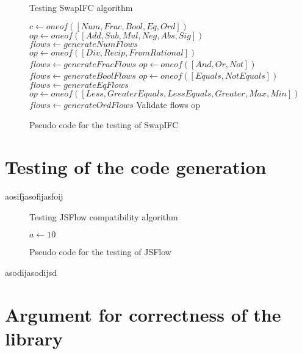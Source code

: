 \begin{figure}[h]
  \begin{algorithm}[H]
    \caption{Testing SwapIFC algorithm}
    \begin{algorithmic}
      \State $c\gets oneof([Num, Frac, Bool, Eq, Ord])$
      \State $op\gets oneof([Add, Sub, Mul, Neg, Abs, Sig])$
      \State $flows\gets generateNumFlows$
      \EndIf        
      \State $op\gets oneof([Div, Recip, FromRational])$
      \State $flows\gets generateFracFlows$
      \EndIf
      \State $op\gets oneof([And, Or, Not])$
      \State $flows\gets generateBoolFlows$
      \EndIf
      \State $op\gets oneof([Equals, NotEquals])$
      \State $flows\gets generateEqFlows$
      \EndIf
      \State $op\gets oneof([Less, GreaterEquals, LessEquals, Greater, Max, Min])$
      \State $flows\gets generateOrdFlows$
      \EndIf
      \State
      \State
      \Return Validate flows op
    \end{algorithmic}
  \end{algorithm}
  \caption{Pseudo code for the testing of SwapIFC}
  \label{fig:testing_swapifc}
\end{figure}

\section{Testing of the code generation}
aosifjasofijasfoij
\begin{figure}[h]
  \begin{algorithm}[H]
    \caption{Testing JSFlow compatibility algorithm}
    \begin{algorithmic}
      \State $a\gets 10$
      \EndIf
    \end{algorithmic}
  \end{algorithm}
  \caption{Pseudo code for the testing of JSFlow}
  \label{fig:testing_jsflow}
\end{figure}
asodijasodijsd

\section{Argument for correctness of the library}
